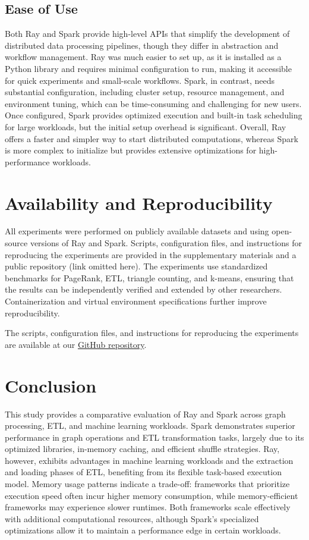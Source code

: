 \documentclass[conference]{IEEEtran}
\begin{document}
\subsection{Ease of Use}
Both Ray and Spark provide high-level
APIs that simplify the development of
distributed data processing pipelines, though they
differ in abstraction and workflow management.
Ray was much easier to set up,
as it is installed as a Python
library and requires minimal configuration to
run, making it accessible for quick experiments
and small-scale workflows. Spark, in contrast,
needs substantial configuration, including cluster setup,
resource management, and environment tuning, which can
be time-consuming and challenging for new users.
Once configured, Spark provides optimized execution
and built-in task scheduling for large workloads,
but the initial setup overhead is significant.
Overall, Ray offers a faster and simpler
way to start distributed computations, whereas
Spark is more complex to initialize but
provides extensive optimizations for high-performance workloads.

\section{Availability and Reproducibility}
All experiments were performed on publicly available datasets and using
open-source versions of Ray and Spark. Scripts, configuration files, and
instructions for reproducing the experiments are provided in the supplementary
materials and a public repository (link omitted here). The experiments use
standardized benchmarks for PageRank, ETL, triangle counting, and k-means,
ensuring that the results can be independently verified and extended by other
researchers. Containerization and virtual environment specifications further
improve reproducibility.

The scripts, configuration files, and instructions for reproducing the experiments are available at our 
\href{https://github.com/liuminex/Big-Data-HDFS-Ray-vs-Spark}{GitHub repository}.



\section{Conclusion}
This study provides a comparative evaluation of Ray and Spark
across graph processing, ETL, and machine learning workloads.
Spark demonstrates superior performance in graph operations and
ETL transformation tasks, largely due to its optimized libraries,
in-memory caching, and efficient shuffle strategies. Ray, however,
exhibits advantages in machine learning workloads and the extraction
and loading phases of ETL, benefiting from its flexible task-based
execution model. Memory usage patterns indicate a trade-off:
frameworks that prioritize execution speed often incur higher
memory consumption, while memory-efficient frameworks may experience
slower runtimes. Both frameworks scale effectively with additional
computational resources, although Spark’s specialized optimizations
allow it to maintain a performance edge in certain workloads. 
\end{document}
